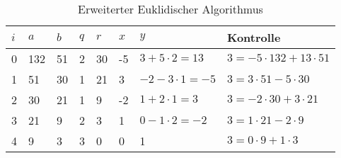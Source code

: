 \begin{table}[h]
  \caption{Erweiterter Euklidischer Algorithmus}
  \centering
  \begin{tabular}{|l|l|l|l|l|l|l|l|}
    \hline
    $i$ & $a$ & $b$ & $q$ & $r$ & $x$ & $y$                   & Kontrolle                        \\ \hline
    0   & 132 & 51  & 2   & 30  & -5  & $3 +5 \cdot 2 = 13$   & $3 = -5 \cdot 132 + 13 \cdot 51$ \\ \hline
    1   & 51  & 30  & 1   & 21  & 3   & $-2 - 3 \cdot 1 = -5$ & $3 = 3 \cdot 51 - 5 \cdot 30$    \\ \hline
    2   & 30  & 21  & 1   & 9   & -2  & $1 + 2 \cdot 1 = 3$   & $3 = -2 \cdot 30 + 3 \cdot 21$   \\ \hline
    3   & 21  & 9   & 2   & 3   & 1   & $0 - 1 \cdot 2 = -2$  & $3 = 1 \cdot 21 - 2 \cdot 9$     \\ \hline
    4   & 9   & 3   & 3   & 0   & 0   & 1                     & $3 = 0 \cdot 9 + 1 \cdot 3$      \\ \hline
  \end{tabular}
\end{table}

